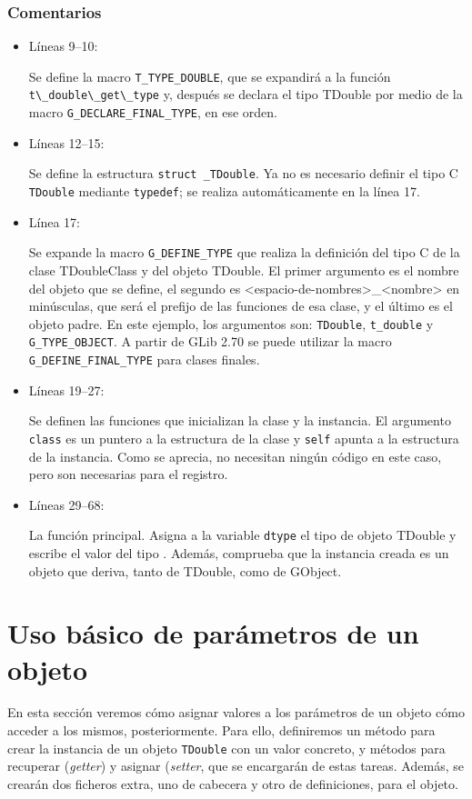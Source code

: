\subsubsection{Comentarios}
\begin{itemize}
\item Líneas 9--10:\par
  Se define la macro \texttt{T\_TYPE\_DOUBLE}, que se expandirá a la función
  \passthrough{\lstinline!t\_double\_get\_type!} y, después se declara el tipo \textsf{TDouble} por medio
  de la macro \texttt{G\_DECLARE\_FINAL\_TYPE}, en ese orden.
\item Líneas 12--15:\par
  Se define la estructura \texttt{struct \_TDouble}. Ya no es necesario definir el tipo C \texttt{TDouble} mediante
  \texttt{typedef}; se realiza automáticamente en la línea 17.
\item Línea 17:\par
  Se expande la macro \texttt{G\_DEFINE\_TYPE} que realiza la definición del tipo C de la clase
  \textsf{TDoubleClass} y del objeto \textsf{TDouble}.
  El primer argumento es el nombre del objeto que se define,   el segundo es \textsf{<espacio-de-nombres>\_<nombre>} en minúsculas, que será el prefijo de las funciones de esa clase,
  y el último es el objeto padre.
  En este ejemplo, los argumentos son: \texttt{TDouble}, \texttt{t\_double} y \texttt{G\_TYPE\_OBJECT}.
  A partir de \textsf{GLib 2.70} se puede utilizar la macro \texttt{G\_DEFINE\_FINAL\_TYPE} para clases finales.
\item Líneas 19--27:\par
  Se definen las funciones que inicializan la clase y la instancia. El argumento \texttt{class} es un puntero a la
  estructura de la clase y \texttt{self} apunta a la estructura de la instancia. Como se aprecia, no
  necesitan ningún código en este caso, pero son necesarias para el registro.
\item Líneas 29--68:\par
  La función principal. Asigna a la variable \texttt{dtype} el tipo de objeto \textsf{TDouble} y escribe el valor
  del tipo . Además, comprueba que la instancia creada es un objeto que deriva, tanto de
  \textsf{TDouble}, como de \textsf{GObject}.
\end{itemize}

\section{Uso básico de parámetros de un objeto}
En esta sección veremos cómo asignar valores  a los parámetros de un objeto cómo acceder a los mismos,
posteriormente. Para ello, definiremos un método para crear la instancia de un objeto \texttt{TDouble}
con un valor concreto, y métodos para recuperar (\emph{getter}) y asignar (\emph{setter}, que se
encargarán de estas tareas.
Además, se crearán dos ficheros extra, uno de cabecera y otro de definiciones, para el objeto.
